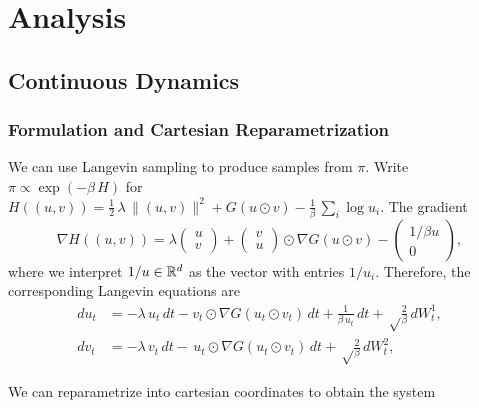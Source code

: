 \documentclass[11pt, twoside]{report}
\begin{document}
\chapter{Analysis}
\section{Continuous Dynamics}
\subsection{Formulation and Cartesian Reparametrization}
We can use Langevin sampling to produce samples from $\pi$. Write $\pi\propto\exp(-\beta\, H)$ for $H((u,v))=\frac 12 \,\lambda\, \|(u,v)\|^2 + G(u\odot v)- \frac{1}{\beta}\,\sum_i\log u_i$. The gradient
\[
\nabla H((u,v))=\lambda\begin{pmatrix}
    u\\v
\end{pmatrix}
+\begin{pmatrix}
    v\\ u
\end{pmatrix}\odot \nabla G(u\odot v)
-\begin{pmatrix}
    1/\beta u\\ 0
\end{pmatrix},
\]
where we interpret $1/u\in\mathbb{R}^d$ as the vector with entries $1/u_i$. Therefore, the corresponding Langevin equations are 
\begin{equation} \label{uvproc}
\begin{split}
du_t&=-\lambda\,   u_t\,dt - v_t\odot \nabla G(u_t\odot v_t)\,dt
 +\frac{1}{\beta \,u_t}\,dt+ \sqrt\frac{2}{\beta}\,dW^1_t,\\
dv_t&=-\lambda\,  v_t\,dt -  \,u_t \odot \nabla G(u_t\odot v_t)\,dt+  \sqrt\frac{2}{\beta}\,dW^2_t,
\label{uvproc}
\end{split}
\end{equation}

We can reparametrize into cartesian coordinates to obtain the system
\end{document}
